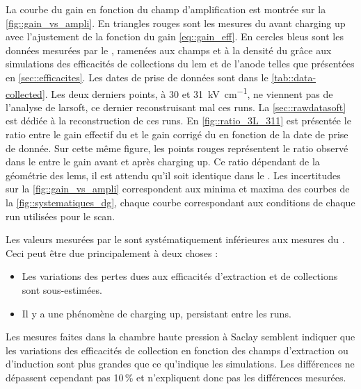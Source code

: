       La courbe du gain en fonction du champ d'amplification est montrée sur la \autoref{fig::gain_vs_ampli}. En triangles rouges sont les mesures du \threeL{} avant charging up avec l'ajustement de la fonction du gain \eqref{eq::gain_eff}. En cercles bleus sont les données mesurées par le \TOO{}, ramenées aux champs et à la densité du \threeL{} grâce aux simulations des efficacités de collections du \gls{lem} et de l'anode telles que présentées en \autoref{sec::efficacites}. Les dates de prise de données sont dans le \autoref{tab::data-collected}. Les deux derniers points, à 30 et \SI{31}{\kilo\volt\per\centi\meter}, ne viennent pas de l'analyse de \gls{larsoft}, ce dernier reconstruisant mal ces runs. La \autoref{sec::rawdatasoft} est dédiée à la reconstruction de ces runs. En \autoref{fig::ratio_3L_311} est présentée le ratio entre le gain effectif du \threeL{} et le gain corrigé du \TOO{} en fonction de la date de prise de donnée. Sur cette même figure, les points rouges représentent le ratio observé dans le \threeL{} entre le gain avant et après charging up. Ce ratio dépendant de la géométrie des \glspl{lem}, il est attendu qu'il soit identique dans le \TOO{}. Les incertitudes sur la \autoref{fig::gain_vs_ampli} correspondent aux minima et maxima des courbes de la \autoref{fig::systematiques_dg}, chaque courbe correspondant aux conditions de chaque run utilisées pour le scan.

      Les valeurs mesurées par le \TOO{} sont systématiquement inférieures aux mesures du \threeL{}. Ceci peut être due principalement à deux choses : 
      \begin{itemize}
        \item Les variations des pertes dues aux efficacités d'extraction et de collections sont sous-estimées.
        \item Il y a une phénomène de charging up, persistant entre les runs.
      \end{itemize}
      Les mesures faites dans la chambre haute pression à Saclay semblent indiquer que les variations des efficacités de collection en fonction des champs d'extraction ou d'induction sont plus grandes que ce qu'indique les simulations. Les différences ne dépassent cependant pas 10\,\% et n'expliquent donc pas les différences mesurées.

